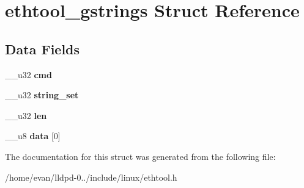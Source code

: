 \section{ethtool\-\_\-gstrings \-Struct \-Reference}
\label{structethtool__gstrings}
\subsection*{\-Data \-Fields}
\begin{DoxyCompactItemize}
\item 
\-\_\-\-\_\-u32 {\bfseries cmd}\label{structethtool__gstrings_a66d231264d5aa36fd7d347e2c967769a}

\item 
\-\_\-\-\_\-u32 {\bfseries string\-\_\-set}\label{structethtool__gstrings_aa768b2277ef2e42d49e6dc6f0a2891ff}

\item 
\-\_\-\-\_\-u32 {\bfseries len}\label{structethtool__gstrings_a6727c6c5c16cc9c9786bfbfd3f30f9a1}

\item 
\-\_\-\-\_\-u8 {\bfseries data} [0]\label{structethtool__gstrings_a1bfe8b027f6e5624818c1a92b91bf6d2}

\end{DoxyCompactItemize}


\-The documentation for this struct was generated from the following file\-:\begin{DoxyCompactItemize}
\item 
/home/evan/lldpd-\/0../include/linux/ethtool.\-h\end{DoxyCompactItemize}
